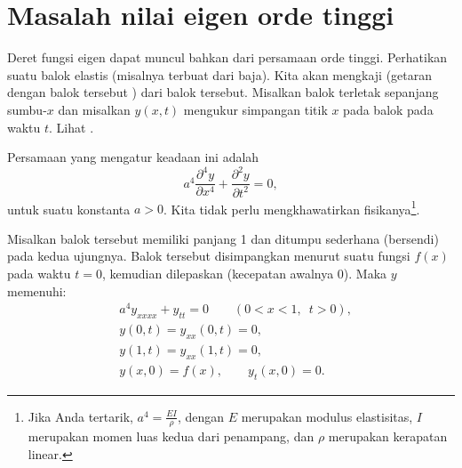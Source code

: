 
\sectionnewpage
\section{Masalah nilai eigen orde tinggi}
\label{sec:appeig}


Deret fungsi eigen dapat muncul bahkan dari persamaan orde tinggi.
Perhatikan suatu balok elastis (misalnya terbuat dari baja).  Kita akan mengkaji
\emph{}
(getaran dengan balok tersebut )
dari balok tersebut.
Misalkan balok terletak sepanjang
sumbu-$x$ dan misalkan $y(x,t)$ mengukur simpangan titik $x$
pada balok pada waktu $t$.  Lihat .

\begin{myfig}
\capstart
{}
\caption{Getaran transversal suatu balok.\label{appeig:transbeamfig}}
\end{myfig}

Persamaan yang mengatur keadaan ini adalah
\begin{equation*}
a^4 \frac{\partial^4 y}{\partial x^4} + \frac{\partial^2 y}{\partial t^2} = 0,
\end{equation*}
untuk suatu konstanta $a > 0$.
Kita tidak perlu mengkhawatirkan fisikanya\footnote{Jika
Anda tertarik, $a^4 = \frac{EI}{\rho}$, dengan $E$ merupakan modulus
elastisitas, $I$ merupakan momen luas kedua dari penampang,
dan $\rho$ merupakan kerapatan linear.}.

Misalkan balok tersebut memiliki panjang 1 dan ditumpu sederhana (bersendi) pada kedua ujungnya.
Balok tersebut disimpangkan menurut suatu fungsi $f(x)$ pada waktu $t=0$, kemudian
dilepaskan (kecepatan awalnya 0).  Maka $y$ memenuhi:
\begin{equation} \label{appeig:beameq}
\begin{aligned}
& a^4 y_{xxxx} + y_{tt} = 0 \qquad (0 < x < 1, \enspace t > 0), \\
& y(0,t) = y_{xx}(0,t) = 0 , \\
& y(1,t) = y_{xx}(1,t) = 0 , \\
& y(x,0) = f(x), \qquad y_{t}(x,0) = 0 .
\end{aligned}
\end{equation}

